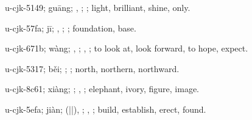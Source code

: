 \begin{multicols}{2}
{\cjkgGlue{}u-cjk-5149; guāng; \cjkgGlue{}\cjkgGlue{}\cjkgGlue{}, \cjkgGlue{}; \cjkgGlue{}; light, brilliant, shine, only.

\cjkgGlue{}u-cjk-57fa; jī; \cjkgGlue{}, \cjkgGlue{}; \cjkgGlue{}; foundation, base.

\cjkgGlue{}u-cjk-671b; wàng; \cjkgGlue{}\cjkgGlue{}\cjkgGlue{}, \cjkgGlue{}; \cjkgGlue{}, \cjkgGlue{}; to look at, look forward, to hope, expect.

\cjkgGlue{}u-cjk-5317; běi; \cjkgGlue{}; \cjkgGlue{}; north, northern, northward.

\cjkgGlue{}u-cjk-8c61; xiàng; \cjkgGlue{}\cjkgGlue{}\cjkgGlue{}; \cjkgGlue{}, \cjkgGlue{}; elephant, ivory, figure, image.

\cjkgGlue{}u-cjk-5efa; jiàn; \cjkgGlue{}\cjkgGlue{}(\cjkgGlue{}|\cjkgGlue{}|\cjkgGlue{}), \cjkgGlue{}\cjkgGlue{}\cjkgGlue{}; \cjkgGlue{}, \cjkgGlue{}; build, establish, erect, found.

}
\end{multicols}
